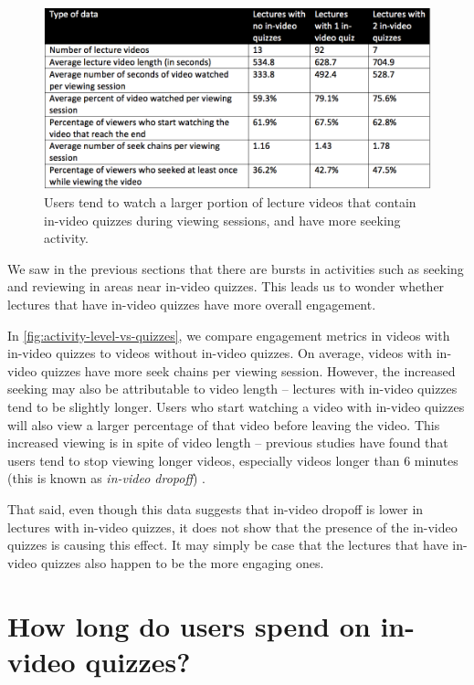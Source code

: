 \documentclass{sigchi}
\begin{document}
\begin{figure}
\includegraphics[width=1.0\columnwidth]{activity-level-vs-quizzes}
\caption{Users tend to watch a larger portion of lecture videos that contain in-video quizzes during viewing sessions, and have more seeking activity.}
\label{fig:activity-level-vs-quizzes}
\end{figure}

We saw in the previous sections that there are bursts in activities such as seeking and reviewing in areas near in-video quizzes. This leads us to wonder whether lectures that have in-video quizzes have more overall engagement.

In \autoref{fig:activity-level-vs-quizzes}, we compare engagement metrics in videos with in-video quizzes to videos without in-video quizzes. On average, videos with in-video quizzes have more seek chains per viewing session. However, the increased seeking may also be attributable to video length -- lectures with in-video quizzes tend to be slightly longer. Users who start watching a video with in-video quizzes will also view a larger percentage of that video before leaving the video. This increased viewing is in spite of video length -- previous studies have found that users tend to stop viewing longer videos, especially videos longer than 6 minutes (this is known as \textit{in-video dropoff}) \cite{juho}.

That said, even though this data suggests that in-video dropoff is lower in lectures with in-video quizzes, it does not show that the presence of the in-video quizzes is causing this effect. It may simply be case that the lectures that have in-video quizzes also happen to be the more engaging ones.

\section{How long do users spend on in-video quizzes?}
\end{document}
